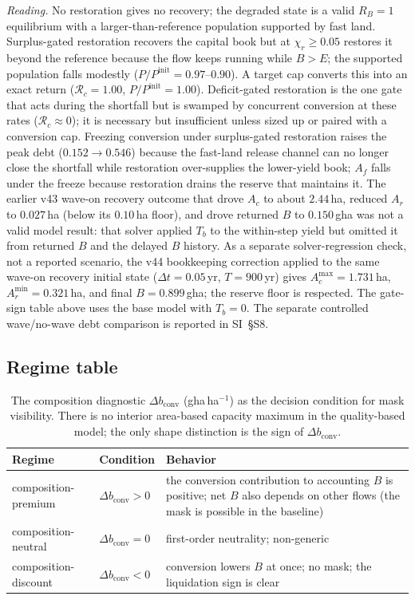 \documentclass[11pt,a4paper]{article}
\newcommand{\dconv}{\Delta b_{\mathrm{conv}}}
\begin{document}
\noindent\emph{Reading.} No restoration gives no recovery; the degraded state is a valid $R_B=1$ equilibrium with a larger-than-reference population supported by fast land. Surplus-gated restoration recovers the capital book but at $\chi_r\ge0.05$ restores it beyond the reference because the flow keeps running while $B>E$; the supported population falls modestly ($P/P^{\mathrm{init}}=0.97$--$0.90$). A target cap converts this into an exact return ($\mathcal R_c=1.00$, $P/P^{\mathrm{init}}=1.00$). Deficit-gated restoration is the one gate that acts during the shortfall but is swamped by concurrent conversion at these rates ($\mathcal R_c\approx0$); it is necessary but insufficient unless sized up or paired with a conversion cap. Freezing conversion under surplus-gated restoration raises the peak debt ($0.152\to0.546$) because the fast-land release channel can no longer close the shortfall while restoration over-supplies the lower-yield book; $A_f$ falls under the freeze because restoration drains the reserve that maintains it. The earlier v43 wave-on recovery outcome that drove $A_c$ to about $2.44$\,ha, reduced $A_r$ to $0.027$\,ha (below its $0.10$\,ha floor), and drove returned $B$ to $0.150$\,gha was not a valid model result: that solver applied $T_b$ to the within-step yield but omitted it from returned $B$ and the delayed $B$ history. As a separate solver-regression check, not a reported scenario, the v44 bookkeeping correction applied to the same wave-on recovery initial state ($\Delta t=0.05$\,yr, $T=900$\,yr) gives $A_c^{\max}=1.731$\,ha, $A_r^{\min}=0.321$\,ha, and final $B=0.899$\,gha; the reserve floor is respected. The gate-sign table above uses the base model with $T_b=0$. The separate controlled wave/no-wave debt comparison is reported in SI~\S S8.

\subsection{Regime table}\label{si:regimes}

\begin{table}[H]
\centering\small
\caption{The composition diagnostic $\dconv$ (gha\,ha$^{-1}$) as the decision condition for mask visibility. There is no interior area-based capacity maximum in the quality-based model; the only shape distinction is the sign of $\dconv$.}
\label{tab:si_regime}
\begin{tabularx}{\textwidth}{l l X}
\toprule
Regime & Condition & Behavior \\
\midrule
composition-premium & $\dconv>0$ & the conversion contribution to accounting $B$ is positive; net $B$ also depends on other flows (the mask is possible in the baseline) \\
composition-neutral & $\dconv=0$ & first-order neutrality; non-generic \\
composition-discount & $\dconv<0$ & conversion lowers $B$ at once; no mask; the liquidation sign is clear \\
\bottomrule
\end{tabularx}
\end{table}
\end{document}
